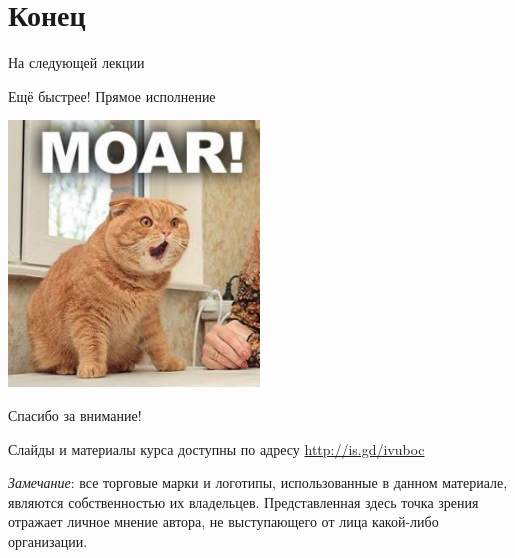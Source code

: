 \documentclass{beamer}
\begin{document}
\section*{Конец}

\begin{frame}{На следующей лекции}

Ещё быстрее! Прямое исполнение

\centering
\includegraphics[width=0.5\textwidth]{./moar}
\end{frame}

\begin{frame}

{\huge{Спасибо за внимание!}\par}

\vfill

Слайды и материалы курса доступны по адресу \url{http://is.gd/ivuboc} %

\vfill

\tiny{\textit{Замечание}: все торговые марки и логотипы, использованные в данном материале, являются собственностью их владельцев. Представленная здесь точка зрения отражает личное мнение автора, не выступающего от лица какой-либо организации.}

\end{frame}
\end{document}
